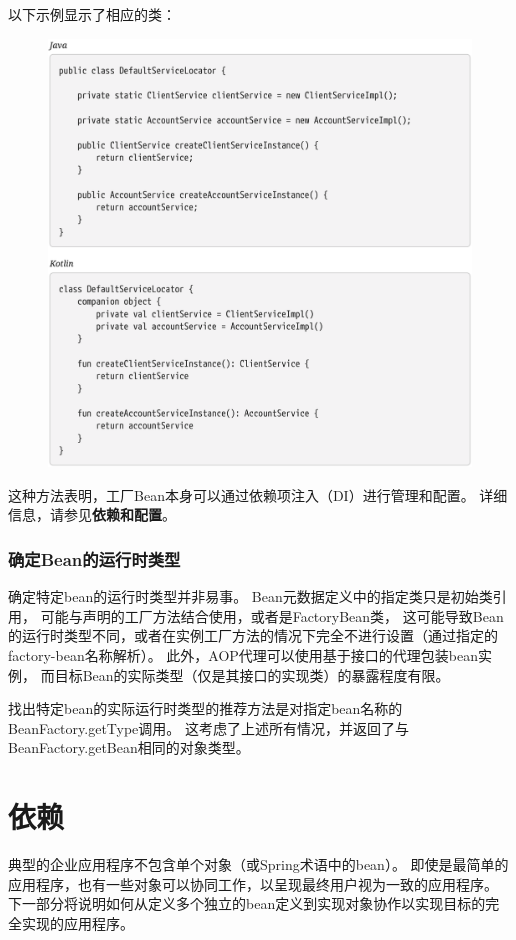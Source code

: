 \newpage
以下示例显示了相应的类：
\begin{figure}[ht]
    \centering
    \includegraphics[width=1\linewidth]{./Figure/IMG_code_20.png}
\end{figure}

这种方法表明，工厂Bean本身可以通过依赖项注入（DI）进行管理和配置。 
详细信息，请参见\textbf{依赖和配置}。

\subsubsection{确定Bean的运行时类型}
确定特定bean的运行时类型并非易事。
 Bean元数据定义中的指定类只是初始类引用，
 可能与声明的工厂方法结合使用，或者是FactoryBean类，
 这可能导致Bean的运行时类型不同，或者在实例工厂方法的情况下完全不进行设置（通过指定的factory-bean名称解析）。
此外，AOP代理可以使用基于接口的代理包装bean实例，
而目标Bean的实际类型（仅是其接口的实现类）的暴露程度有限。

找出特定bean的实际运行时类型的推荐方法是对指定bean名称的BeanFactory.getType调用。 
这考虑了上述所有情况，并返回了与BeanFactory.getBean相同的对象类型。

\section{依赖}
典型的企业应用程序不包含单个对象（或Spring术语中的bean）。 即使是最简单的应用程序，也有一些对象可以协同工作，以呈现最终用户视为一致的应用程序。 下一部分将说明如何从定义多个独立的bean定义到实现对象协作以实现目标的完全实现的应用程序。

